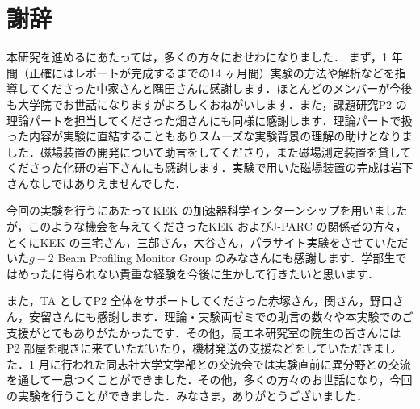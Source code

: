 \section*{謝辞}

本研究を進めるにあたっては，多くの方々におせわになりました．
まず，1 年間（正確にはレポートが完成するまでの14 ヶ月間）実験の方法や解析などを指導してくださった中家さんと隅田さんに感謝します．ほとんどのメンバーが今後も大学院でお世話になりますがよろしくおねがいします．また，課題研究P2 の理論パートを担当してくださった畑さんにも同様に感謝します．理論パートで扱った内容が実験に直結することもありスムーズな実験背景の理解の助けとなりました．磁場装置の開発について助言をしてくださり，また磁場測定装置を貸してくださった化研の岩下さんにも感謝します．実験で用いた磁場装置の完成は岩下さんなしではありえませんでした．

今回の実験を行うにあたってKEK の加速器科学インターンシップを用いましたが，このような機会を与えてくださったKEK およびJ-PARC の関係者の方々，とくにKEK の三宅さん，三部さん，大谷さん，パラサイト実験をさせていただいた$g-2$ Beam Profiling Monitor Group のみなさんにも感謝します．学部生ではめったに得られない貴重な経験を今後に生かして行きたいと思います．

また，TA としてP2 全体をサポートしてくださった赤塚さん，関さん，野口さん，安留さんにも感謝します．理論・実験両ゼミでの助言の数々や本実験でのご支援がとてもありがたかったです．その他，高エネ研究室の院生の皆さんにはP2 部屋を覗きに来ていただいたり，機材発送の支援などをしていただきました．1 月に行われた同志社大学文学部との交流会では実験直前に異分野との交流を通して一息つくことができました．その他，多くの方々のお世話になり，今回の実験を行うことができました．みなさま，ありがとうございました．